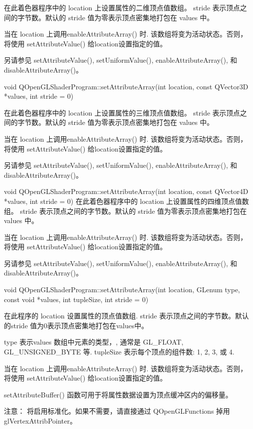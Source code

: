 在此着色器程序中的 location 上设置属性的二维顶点值数组。 stride 表示顶点之间的字节数。默认的 stride 值为零表示顶点密集地打包在 values 中。

当在 location 上调用enableAttributeArray() 时. 该数组将变为活动状态。否则，将使用 setAttributeValue() 给location设置指定的值。

另请参见 setAttributeValue(), setUniformValue(), enableAttributeArray(), 和 disableAttributeArray()。

void QOpenGLShaderProgram::setAttributeArray(int location, const QVector3D *values, int stride = 0)

在此着色器程序中的 location 上设置属性的三维顶点值数组。 stride 表示顶点之间的字节数。默认的 stride 值为零表示顶点密集地打包在 values 中。

当在 location 上调用enableAttributeArray() 时. 该数组将变为活动状态。否则，将使用 setAttributeValue() 给location设置指定的值。

另请参见 setAttributeValue(), setUniformValue(), enableAttributeArray(), 和 disableAttributeArray()。

void QOpenGLShaderProgram::setAttributeArray(int location, const QVector4D *values, int stride = 0)
在此着色器程序中的 location 上设置属性的四维顶点值数组。 stride 表示顶点之间的字节数。默认的 stride 值为零表示顶点密集地打包在 values 中。

当在 location 上调用enableAttributeArray() 时. 该数组将变为活动状态。否则，将使用 setAttributeValue() 给location设置指定的值。

另请参见 setAttributeValue(), setUniformValue(), enableAttributeArray(), 和 disableAttributeArray()。

void QOpenGLShaderProgram::setAttributeArray(int location, GLenum type, const void *values, int tupleSize, int stride = 0)

在此程序的 location 设置属性的顶点值数组. stride 表示顶点之间的字节数。默认的stride 值为0表示顶点密集地打包在values中。

type 表示values 数组中元素的类型，, 通常是 GL\_FLOAT, GL\_UNSIGNED\_BYTE 等. tupleSize 表示每个顶点的组件数: 1, 2, 3, 或 4.

当在 location 上调用enableAttributeArray() 时. 该数组将变为活动状态。否则，将使用 setAttributeValue() 给location设置指定的值。

setAttributeBuffer() 函数可用于将属性数据设置为顶点缓冲区内的偏移量。

注意： 将启用标准化。如果不需要，请直接通过 QOpenGLFunctions 掉用glVertexAttribPointer。

